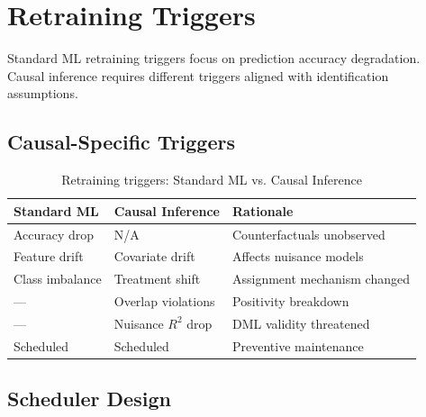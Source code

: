 \section{Retraining Triggers}\label{sec:retraining_triggers}

Standard ML retraining triggers focus on prediction accuracy degradation. Causal inference requires different triggers aligned with identification assumptions.

\subsection{Causal-Specific Triggers}

\begin{table}[htbp]
\centering
\caption{Retraining triggers: Standard ML vs. Causal Inference}
\label{tab:retrain_triggers}
\begin{tabular}{lll}
\toprule
\textbf{Standard ML} & \textbf{Causal Inference} & \textbf{Rationale} \\
\midrule
Accuracy drop & N/A & Counterfactuals unobserved \\
Feature drift & Covariate drift & Affects nuisance models \\
Class imbalance & Treatment shift & Assignment mechanism changed \\
--- & Overlap violations & Positivity breakdown \\
--- & Nuisance $R^2$ drop & DML validity threatened \\
Scheduled & Scheduled & Preventive maintenance \\
\bottomrule
\end{tabular}
\end{table}

\subsection{Scheduler Design}

